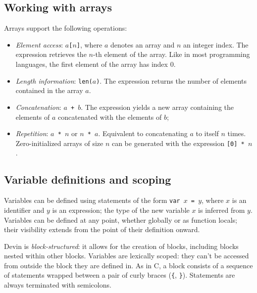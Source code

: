 \documentclass[UdineBachThesis,american,11pt]{PhdThesis}
\begin{document}
  \newpage

  \subsection{Working with arrays}

  Arrays support the following operations:

  \begin{itemize}
    \item \emph{Element access}: \mbox{\texttt{$a$[$n$]}}, where $a$ denotes an
    array and $n$ an integer index. The expression retrieves the $n$-th element
    of the array. Like in most programming languages, the first element of the
    array has index $0$.

    \item \emph{Length information}: \mbox{\texttt{len($a$)}}. The expression
    returns the number of elements contained in the array $a$.

    \item \emph{Concatenation}: \mbox{\texttt{$a$ + $b$}}. The expression yields
    a new array containing the elements of $a$ concatenated with the elements of
    $b$;

    \item \emph{Repetition}: \mbox{\texttt{$a$ * $n$}} or
    \mbox{\texttt{$n$ * $a$}}. Equivalent to concatenating $a$ to itself $n$
    times. \\
    Zero-initialized arrays of size $n$ can be generated with the expression
    \mbox{\texttt{[0] * $n$}}.
  \end{itemize}

  \subsection{Variable definitions and scoping}

  Variables can be defined using statements of the form
  \mbox{\texttt{var $x$ = $y$}}, where $x$ is an identifier and $y$ is an
  expression; the type of the new variable $x$ is inferred from $y$. Variables
  can be defined at any point, whether globally or as function locals; their
  visibility extends from the point of their definition onward.

  Devin is \emph{block-structured}: it allows for the creation of blocks,
  including blocks nested within other blocks. Variables are lexically scoped:
  they can't be accessed from outside the block they are defined in. As in C, a
  block consists of a sequence of statements wrapped between a pair of curly
  braces (\texttt{\{}, \texttt{\}}). Statements are always terminated with
  semicolons.
\end{document}
